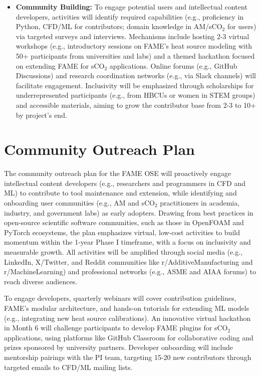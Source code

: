 \documentclass[11pt]{article}
\begin{document}
\begin{itemize}
    \item \textbf{Community Building:} To engage potential users and intellectual content developers, activities will identify required capabilities (e.g., proficiency in Python, CFD/ML for contributors; domain knowledge in AM/sCO$_2$ for users) via targeted surveys and interviews. Mechanisms include hosting 2-3 virtual workshops (e.g., introductory sessions on FAME's heat source modeling with 50+ participants from universities and labs) and a themed hackathon focused on extending FAME for sCO$_2$ applications. Online forums (e.g., GitHub Discussions) and research coordination networks (e.g., via Slack channels) will facilitate engagement. Inclusivity will be emphasized through scholarships for underrepresented participants (e.g., from HBCUs or women in STEM groups) and accessible materials, aiming to grow the contributor base from 2-3 to 10+ by project's end.
\end{itemize}

\section*{Community Outreach Plan}
\vspace{-3pt}
\noindent
The community outreach plan for the FAME OSE will proactively engage intellectual content developers (e.g., researchers and programmers in CFD and ML) to contribute to tool maintenance and extension, while identifying and onboarding user communities (e.g., AM and sCO$_2$ practitioners in academia, industry, and government labs) as early adopters. Drawing from best practices in open-source scientific software communities, such as those in OpenFOAM and PyTorch ecosystems, the plan emphasizes virtual, low-cost activities to build momentum within the 1-year Phase I timeframe, with a focus on inclusivity and measurable growth. All activities will be amplified through social media (e.g., LinkedIn, X/Twitter, and Reddit communities like r/AdditiveManufacturing and r/MachineLearning) and professional networks (e.g., ASME and AIAA forums) to reach diverse audiences.

To engage developers, quarterly webinars will cover contribution guidelines, FAME's modular architecture, and hands-on tutorials for extending ML models (e.g., integrating new heat source calibrations). An innovative virtual hackathon in Month 6 will challenge participants to develop FAME plugins for sCO$_2$ applications, using platforms like GitHub Classroom for collaborative coding and prizes sponsored by university partners. Developer onboarding will include mentorship pairings with the PI team, targeting 15-20 new contributors through targeted emails to CFD/ML mailing lists.
\end{document}
